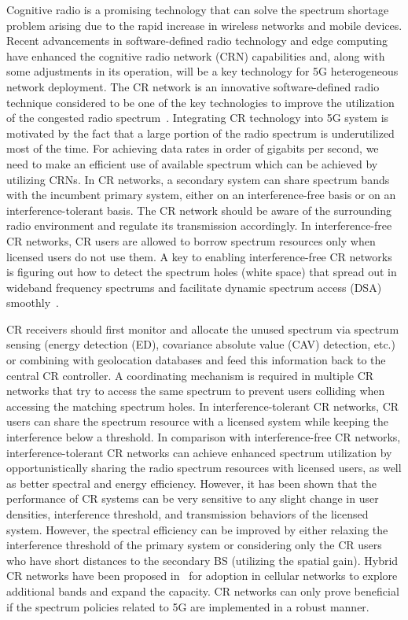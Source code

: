 Cognitive radio is a promising technology that can solve the spectrum shortage problem arising due to the rapid increase in wireless networks and mobile devices. Recent advancements in software-defined radio technology and edge computing have enhanced the cognitive radio network (CRN)  capabilities and, along with some adjustments in its operation, will be a key technology for 5G heterogeneous network deployment.  The CR network is an innovative software-defined radio technique considered to be one of the key technologies to improve the utilization of the congested radio spectrum~\cite{rusek2013scaling}. Integrating CR technology into 5G system is motivated by the fact that a large portion of the radio spectrum is underutilized most of the time. For achieving data rates in order of gigabits per second, we need to make an efficient use of available spectrum which can be achieved by utilizing CRNs. In CR networks, a secondary system can share spectrum bands with the incumbent primary system, either on an interference-free basis or on an interference-tolerant basis. The CR network should be aware of
the surrounding radio environment and regulate its transmission accordingly. In interference-free CR networks, CR users are allowed to borrow spectrum resources only when licensed users do
not use them. A key to enabling interference-free CR networks is figuring out how to detect the spectrum holes (white space) that spread out in wideband frequency spectrums and facilitate dynamic spectrum access (DSA) smoothly~\cite{wyglinski2009cognitive}. 

CR receivers should first monitor and allocate the unused spectrum via spectrum sensing (energy detection (ED), covariance absolute value (CAV) detection, etc.) or combining with geolocation databases and feed this information back to the central CR controller. A coordinating mechanism is required in multiple CR networks that try to access the same spectrum to prevent users colliding when accessing the matching spectrum holes. In interference-tolerant CR networks, CR users can share the spectrum resource with a licensed system while keeping the interference below a threshold. In comparison with interference-free CR networks, interference-tolerant CR networks can achieve enhanced spectrum utilization by opportunistically sharing the radio spectrum resources with licensed users, as well as better spectral and energy efficiency. However, it has been shown that the performance of CR systems can be very sensitive to any slight change in user densities, interference threshold, and transmission behaviors of the licensed system. However, the spectral efficiency can be improved by either relaxing the interference threshold of the primary system or considering only the CR users who have short distances to the secondary BS (utilizing the spatial gain). Hybrid CR networks have been proposed in~\cite{hong2010capacity} for adoption in cellular networks to explore additional bands and expand the capacity. CR networks can only prove beneficial if the spectrum policies related to 5G are implemented in a robust manner. 



